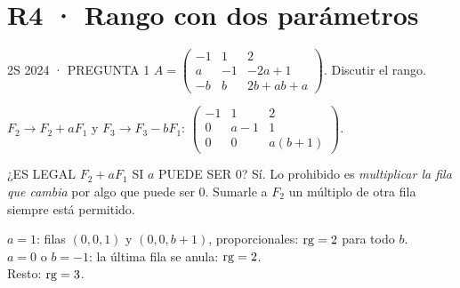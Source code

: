 \section*{R4 · Rango con dos parámetros}
\begin{enunciado}{2S 2024 · PREGUNTA 1}
$A=\begin{pmatrix}-1&1&2\\a&-1&-2a+1\\-b&b&2b+ab+a\end{pmatrix}$. Discutir el rango.
\end{enunciado}
$F_2\to F_2+aF_1$ y $F_3\to F_3-bF_1$: \quad $\begin{pmatrix}-1&1&2\\0&a-1&1\\0&0&a(b+1)\end{pmatrix}$.
\begin{uso}{¿ES LEGAL $F_2+aF_1$ SI $a$ PUEDE SER 0?}
Sí. Lo prohibido es \emph{multiplicar la fila que cambia} por algo que puede ser 0. Sumarle a $F_2$ un múltiplo de otra fila siempre está permitido.
\end{uso}
$a=1$: filas $(0,0,1)$ y $(0,0,b+1)$, proporcionales: $\operatorname{rg}=2$ para todo $b$.\\
$a=0$ o $b=-1$: la última fila se anula: $\operatorname{rg}=2$.\\
Resto: $\operatorname{rg}=3$.

